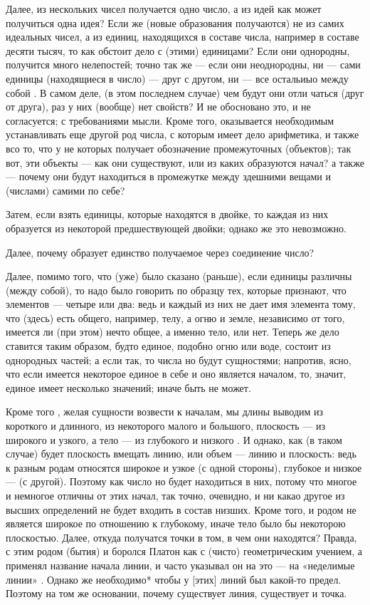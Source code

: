 \documentclass{article}
\begin{document}
Далее, из нескольких чисел получается одно число, а из идей как может получиться одна идея?
\footnotemark[21]
Если же (новые образования получаются) не из самих идеальных чисел, а из единиц, находящихся в составе числа, например в составе десяти тысяч, то как обстоит дело с (этими) единицами? Если они однородны, получится много нелепостей;
\footnotemark[22]
точно так же — если они неоднородны, ни — сами единицы (находящиеся в число) — друг с другом, ни — все остальиыо между собой . В самом деле, (в этом последнем случае) чем будут они отли чаться (друг от друга), раз у них (вообще) нет свойств? И не обосновано это, и не согласуется; с требованиями мысли. Кроме того, оказывается необходимым устанавливать еще другой род числа, с которым имеет дело арифметика, и также всо то, что у не которых получает обозначение промежуточных (объектов); так вот, эти объекты — как они существуют, или из каких образуются начал?
\footnotemark[23]
а также — почему они будут находиться в промежутке между здешними вещами и (числами) самими по себе?

Затем, если взять единицы, которые находятся в двойке, то каждая из них образуется из некоторой предшествующей двойки;
\footnotemark[24]
однако же это невозможно.

Далее, почему образует единство получаемое через соединение число?
\footnotemark[25]


Далее, помимо того, что (уже) было сказано (раньше), если единицы различны (между собой), то надо было говорить по образцу тех, которые признают, что элементов — четыре или два: ведь и каждый из них не дает имя элемента тому, что (здесь) есть общего, например, телу, а огню и земле, независимо от того, имеется ли (при этом) нечто общее, а именно тело, или нет. Теперь же дело ставится таким образом, будто единое, подобно огню или воде, состоит из однородных частей; а если так, то числа но будут сущностями;
\footnotemark[26]
напротив, ясно, что если имеется некоторое единое в себе и оно является началом, то, значит, единое имеет несколько значений;
\footnotemark[27]
иначе быть не может.

Кроме того , желая сущности возвести к началам, мы  длины  выводим из короткого и длинного, из некоторого малого и большого, плоскость — из широкого и узкого, а тело — из глубокого и низкого . И однако, как (в таком случае)
\footnotemark[28]
будет плоскость вмещать линию, или объем — линию и плоскость: ведь к разным родам относятся широкое и узкое (с одной стороны), глубокое и низкое — (с другой). Поэтому как число но будет находиться в них,
\footnotemark[29]
потому что многое и немногое отличны от этих начал,
\footnotemark[30]
так точно, очевидно, и ни какао другое из высших определений не будет входить в состав низших. Кроме того, и родом не является широкое по отношению к глубокому, иначе тело было бы некоторою плоскостью. Далее, откуда получатся точки в том, в чем они находятся?
\footnotemark[31]
Правда, с этим родом (бытия) и боролся Платон как с (чисто) геометрическим учением, а применял название начала линии, и часто указывал он на это — на «неделимые линии» . Однако же необходимо* чтобы у [этих] линий был какой-то предел. Поэтому на том же основании, почему существует линия, существует и точка.
\footnotemark[32]
\end{document}
